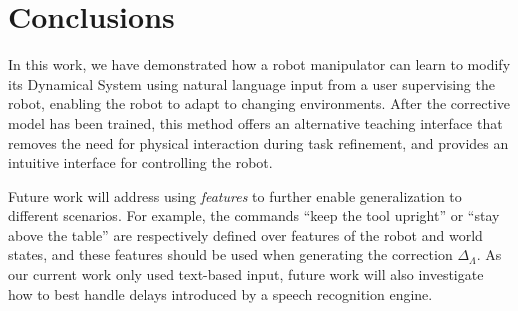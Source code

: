\section{Conclusions}
\label{secConclusions}


In this work, we have demonstrated how a robot manipulator can learn to modify its Dynamical System using natural language input from a user supervising the robot, enabling the robot to adapt to changing environments.
After the corrective model has been trained, this method offers an alternative teaching interface
that removes the need for physical interaction during task refinement, and provides an intuitive interface for controlling the robot.

Future work will address using \emph{features} to further enable generalization to different scenarios.
For example, the commands ``keep the tool upright'' or ``stay above the table'' are respectively defined over features of the robot and world states, and these features should be used when generating the correction $\Delta_\Lambda$.
As our current work only used text-based input, future work will also investigate how to best handle delays introduced by a speech recognition engine.


